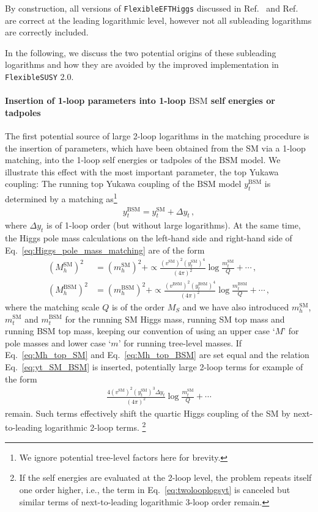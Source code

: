 \documentclass[final,3p,11pt,pdflatex]{elsarticle}
\makeatletter
\newcommand{\fs}{\texttt{FlexibleSUSY}\@\xspace}
\newcommand{\fstwo}{\fs 2.0\@\xspace}
\newcommand{\feft}{\texttt{Flex\-ib\-le\-EFT\-Higgs}\@\xspace}
\newcommand{\SM}{\ensuremath{\text{SM}}\xspace}
\newcommand{\BSM}{\ensuremath{\text{BSM}}\xspace}
\newcommand{\MS}{\ensuremath{M_S}\xspace}
\makeatother
\begin{document}
By construction, all versions of \feft discussed in
Ref.~\cite{Athron:2016fuq} and Ref.~\cite{Staub:2017jnp} are correct at the
leading logarithmic level, however not all subleading logarithms are correctly
included.
%

In the following, we discuss the two potential origins of these subleading
logarithms and how they are avoided by the improved  implementation in
\fstwo.

\paragraph{Insertion of 1-loop parameters into 1-loop \BSM self energies or
  tadpoles}

The first potential source of large 2-loop logarithms in the matching
procedure is the insertion of parameters, which have been obtained from the SM
via a 1-loop matching, into the 1-loop self energies or tadpoles of the \BSM
model.  We illustrate this effect with the most important parameter, the top
Yukawa coupling:
The running top Yukawa coupling of the \BSM model  $y_t^\BSM$ is
determined by a matching as\footnote{We ignore potential tree-level
  factors here for brevity.}
%
\begin{align}
  y_t^\BSM = y_t^\SM + \Delta y_t \,, \label{eq:yt_SM_BSM}
\end{align}
%
where $\Delta y_t$ is of 1-loop order (but without large logarithms).
At the same time, the Higgs pole mass calculations on the left-hand side and
right-hand side of Eq.~\eqref{eq:Higgs_pole_mass_matching} are of the form
%
\begin{align}
  (M_h^\SM)^2 &= (m_h^\SM)^2 + \propto \frac{(v^\SM)^2(y_t^\SM)^4}{(4\pi)^2} \log\frac{m_t^\SM}{Q} + \cdots \,,
  \label{eq:Mh_top_SM}\\
  (M_h^\BSM)^2 &= (m_h^\BSM)^2 + \propto \frac{(v^\BSM)^2(y_t^\BSM)^4}{(4\pi)^2} \log\frac{m_t^\BSM}{Q} + \cdots \,,
  \label{eq:Mh_top_BSM}
\end{align}
%
where the matching scale $Q$ is of the order $\MS$ and we have also
introduced $m_h^\SM$, $m_t^\SM$ and $m_t^\BSM$ for the running SM
Higgs mass, running SM top mass and running BSM top mass,
keeping our convention of using an upper case `$M$' for pole masses
and lower case `$m$' for running tree-level masses.  If
Eq.\ \eqref{eq:Mh_top_SM} and Eq.\ \eqref{eq:Mh_top_BSM} are set equal
and the relation Eq.\ \eqref{eq:yt_SM_BSM} is inserted, potentially
large 2-loop terms for example of the form
%
\begin{align}
  \frac{4(v^\SM)^2(y_t^\SM)^3 \Delta y_t}{(4\pi)^2} \log\frac{m_t^\SM}{Q} + \cdots
\label{eq:twolooplogsyt}
\end{align}
%
remain. Such terms effectively shift the quartic Higgs coupling of the
SM by  next-to-leading logarithmic 2-loop terms.%
\footnote{If the self energies are evaluated at the
  2-loop level, the problem repeats itself one order higher, i.e., the
  term in Eq.~\eqref{eq:twolooplogsyt} is canceled but similar terms of
  next-to-leading logarithmic 3-loop order remain.}
\end{document}
